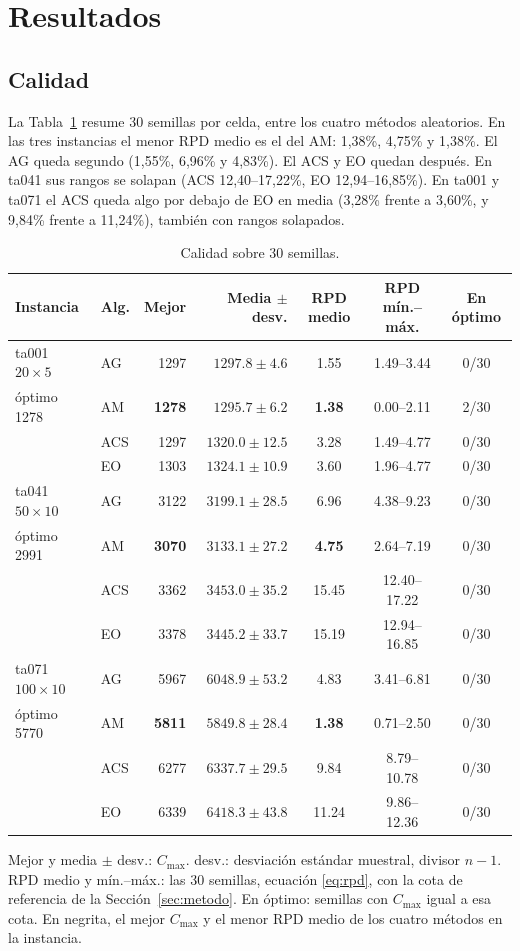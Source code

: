 \documentclass[journal]{IEEEtran}
\newcounter{lin}\newcommand{\li}{\stepcounter{lin}\thelin:\ }
\newcommand{\notatabla}[1]{\par\vspace{4pt}\colorbox{gray!12}{\parbox{\dimexpr\linewidth-2\fboxsep\relax}{\footnotesize\raggedright #1}}}
\begin{document}
\section{Resultados}\label{sec:resultados}
\subsection{Calidad}
La Tabla~\ref{tab:calidad} resume 30 semillas por celda, entre los cuatro métodos aleatorios. En las tres instancias el menor RPD medio es el del AM: 1,38\%, 4,75\% y 1,38\%. El AG queda segundo (1,55\%, 6,96\% y 4,83\%). El ACS y EO quedan después. En ta041 sus rangos se solapan (ACS 12,40--17,22\%, EO 12,94--16,85\%). En ta001 y ta071 el ACS queda algo por debajo de EO en media (3,28\% frente a 3,60\%, y 9,84\% frente a 11,24\%), también con rangos solapados.

\begin{table}[!t]
  \caption{Calidad sobre 30 semillas.}\label{tab:calidad}
  \centering\footnotesize
  \begin{tabular}{l l r r c c c}\hline
    Instancia & Alg. & Mejor & Media $\pm$ desv. & RPD medio & RPD mín.--máx. & En óptimo\\ \hline
    ta001 $20\times5$ & AG & 1297 & $1297.8\pm 4.6$ & 1.55 & 1.49--3.44 & 0/30\\
    óptimo 1278 & AM & \textbf{1278} & $1295.7\pm 6.2$ & \textbf{1.38} & 0.00--2.11 & 2/30\\
    & ACS & 1297 & $1320.0\pm 12.5$ & 3.28 & 1.49--4.77 & 0/30\\
    & EO & 1303 & $1324.1\pm 10.9$ & 3.60 & 1.96--4.77 & 0/30\\ \hline
    ta041 $50\times10$ & AG & 3122 & $3199.1\pm 28.5$ & 6.96 & 4.38--9.23 & 0/30\\
    óptimo 2991 & AM & \textbf{3070} & $3133.1\pm 27.2$ & \textbf{4.75} & 2.64--7.19 & 0/30\\
    & ACS & 3362 & $3453.0\pm 35.2$ & 15.45 & 12.40--17.22 & 0/30\\
    & EO & 3378 & $3445.2\pm 33.7$ & 15.19 & 12.94--16.85 & 0/30\\ \hline
    ta071 $100\times10$ & AG & 5967 & $6048.9\pm 53.2$ & 4.83 & 3.41--6.81 & 0/30\\
    óptimo 5770 & AM & \textbf{5811} & $5849.8\pm 28.4$ & \textbf{1.38} & 0.71--2.50 & 0/30\\
    & ACS & 6277 & $6337.7\pm 29.5$ & 9.84 & 8.79--10.78 & 0/30\\
    & EO & 6339 & $6418.3\pm 43.8$ & 11.24 & 9.86--12.36 & 0/30\\ \hline
  \end{tabular}
  \notatabla{Mejor y media $\pm$ desv.: $C_{\max}$. desv.: desviación estándar muestral, divisor $n-1$. RPD medio y mín.--máx.: las 30 semillas, ecuación \eqref{eq:rpd}, con la cota de referencia de la Sección~\ref{sec:metodo}. En óptimo: semillas con $C_{\max}$ igual a esa cota. En negrita, el mejor $C_{\max}$ y el menor RPD medio de los cuatro métodos en la instancia.}
\end{table}
\end{document}
